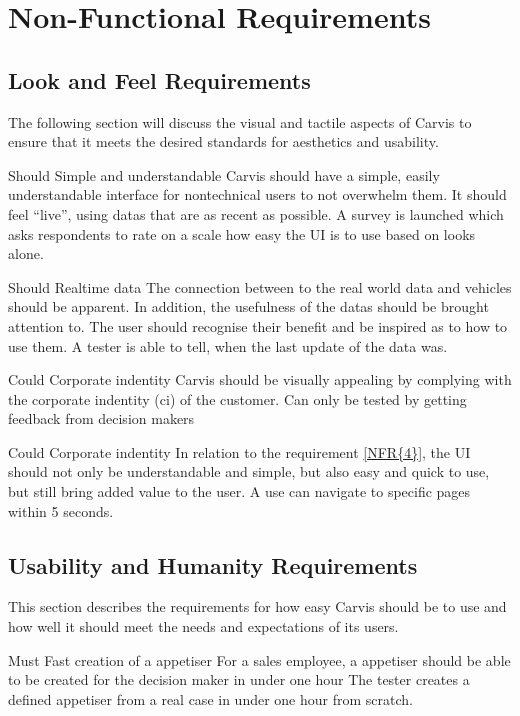 \chapter{Non-Functional Requirements}

\section{Look and Feel Requirements}
The following section will discuss the visual and tactile aspects of Carvis to ensure that it meets the desired standards for aesthetics and usability.
\label{sec:appearancerequirements}

{Should}
{Simple and understandable}
{Carvis should have a simple, easily understandable interface for \gls{nontechnical} users to not overwhelm them. It should feel \enquote{live}, using \glspl{data} that are as recent as possible.}
{A survey is launched which asks respondents to rate on a scale how easy the UI is to use based on looks alone.}

{Should}
{Realtime data}
{The connection between to the real world data and vehicles should be apparent. In addition, the usefulness of the \glspl{data} should be brought attention to. The user should recognise their benefit and be inspired as to how to use them.}
{A tester is able to tell, when the last update of the data was.}

{Could}
{Corporate indentity}
{Carvis should be visually appealing by complying with the corporate indentity (\gls{ci}) of the customer.}
{Can only be tested by getting feedback from decision makers}

{Could}
{Corporate indentity}
{In relation to the requirement \autoref{NFR{4}}, the UI should not only be understandable and simple, but also easy and quick to use, but still bring added value to the user.}
{A use can navigate to specific pages within 5 seconds.}

\section{Usability and Humanity Requirements}
This section describes the requirements for how easy Carvis should be to use and how well it should meet the needs and expectations of its users.

{Must}
{Fast creation of a \gls{appetiser}}
{For a sales employee, a \gls{appetiser} should be able to be created for the decision maker in under one hour}
{The tester creates a defined \gls{appetiser} from a real case in under one hour from scratch.}

